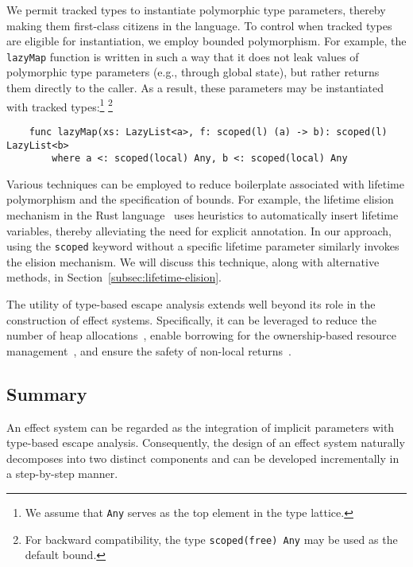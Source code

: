 \documentclass[acmsmall,review,screen]{acmart}
\begin{document}
We permit tracked types to instantiate polymorphic type parameters, thereby making them first-class citizens in the language.
To control when tracked types are eligible for instantiation, we employ bounded polymorphism.
For example, the \texttt{lazyMap} function is written in such a way that it does not leak values of polymorphic type parameters (e.g., through global state), but rather returns them directly to the caller.
As a result, these parameters may be instantiated with tracked types:\footnote{We assume that \texttt{Any} serves as the top element in the type lattice.} \footnote{For backward compatibility, the type \texttt{scoped(free) Any} may be used as the default bound.}
\begin{verbatim}
    func lazyMap(xs: LazyList<a>, f: scoped(l) (a) -> b): scoped(l) LazyList<b>
        where a <: scoped(local) Any, b <: scoped(local) Any
\end{verbatim}


Various techniques can be employed to reduce boilerplate associated with lifetime polymorphism and the specification of bounds. %
For example, the lifetime elision mechanism in the Rust language~\cite{matsakis2014rust} uses heuristics to automatically insert lifetime variables, thereby alleviating the need for explicit annotation.
In our approach, using the \texttt{scoped} keyword without a specific lifetime parameter similarly invokes the elision mechanism.
We will discuss this technique, along with alternative methods, in Section~\ref{subsec:lifetime-elision}.

The utility of type-based escape analysis extends well beyond its role in the construction of effect systems.
Specifically, it can be leveraged to reduce the number of heap allocations~\cite{lorenzen2024oxidizing}, enable borrowing for the ownership-based resource management~\cite{matsakis2014rust, lorenzen2024oxidizing}, and ensure the safety of non-local returns~\cite{akhin2021kotlin}.

\subsection{Summary} \label{subsec:idea-summary}

An effect system can be regarded as the integration of implicit parameters with type-based escape analysis.
Consequently, the design of an effect system naturally decomposes into two distinct components and can be developed incrementally in a step-by-step manner.
\end{document}
